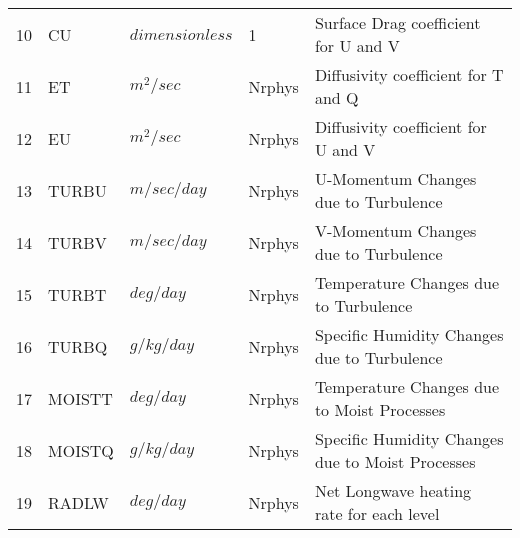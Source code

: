 \begin{tabular}{lllll}
10 & CU       & $dimensionless$ &  1 
         &\begin{minipage}[t]{3in}
          {Surface Drag coefficient for U and V}
         \end{minipage}\\
11 & ET       &  $m^2/sec$ &  Nrphys
         &\begin{minipage}[t]{3in}
          {Diffusivity coefficient for T and Q}
         \end{minipage}\\
12 & EU       &  $m^2/sec$ &  Nrphys
         &\begin{minipage}[t]{3in}
          {Diffusivity coefficient for U and V}
         \end{minipage}\\
13 & TURBU    &  $m/sec/day$ &  Nrphys 
         &\begin{minipage}[t]{3in}
          {U-Momentum Changes due to Turbulence}
         \end{minipage}\\
14 & TURBV    &  $m/sec/day$ &  Nrphys 
         &\begin{minipage}[t]{3in}
          {V-Momentum Changes due to Turbulence}
         \end{minipage}\\
15 & TURBT    &  $deg/day$ &  Nrphys 
         &\begin{minipage}[t]{3in}
          {Temperature Changes due to Turbulence}
         \end{minipage}\\
16 & TURBQ    &  $g/kg/day$ &  Nrphys 
         &\begin{minipage}[t]{3in}
          {Specific Humidity Changes due to Turbulence}
         \end{minipage}\\
17 & MOISTT   &   $deg/day$ &  Nrphys 
         &\begin{minipage}[t]{3in}
          {Temperature Changes due to Moist Processes}
         \end{minipage}\\
18 & MOISTQ   &  $g/kg/day$ &  Nrphys 
         &\begin{minipage}[t]{3in}
          {Specific Humidity Changes due to Moist Processes}
         \end{minipage}\\
19 & RADLW    &  $deg/day$ &  Nrphys 
         &\begin{minipage}[t]{3in}
          {Net Longwave heating rate for each level}

\end{minipage}
\end{tabular}
